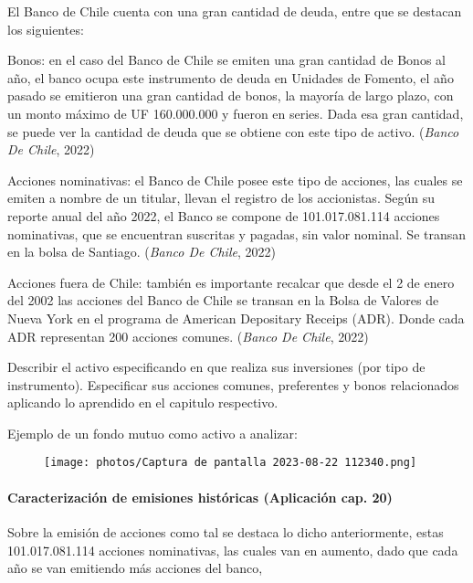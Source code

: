 \documentclass[
  letterpaper,
  DIV=11,
  numbers=noendperiod]{scrartcl}
\let\oldparagraph\paragraph
\renewcommand{\paragraph}[1]{\oldparagraph{#1}\mbox{}}
\begin{document}
El Banco de Chile cuenta con una gran cantidad de deuda, entre que se
destacan los siguientes:

Bonos: en el caso del Banco de Chile se emiten una gran cantidad de
Bonos al año, el banco ocupa este instrumento de deuda en Unidades de
Fomento, el año pasado se emitieron una gran cantidad de bonos, la
mayoría de largo plazo, con un monto máximo de UF 160.000.000 y fueron
en series. Dada esa gran cantidad, se puede ver la cantidad de deuda que
se obtiene con este tipo de activo. (\emph{Banco De Chile}, 2022)

Acciones nominativas: el Banco de Chile posee este tipo de acciones, las
cuales se emiten a nombre de un titular, llevan el registro de los
accionistas. Según su reporte anual del año 2022, el Banco se compone de
101.017.081.114 acciones nominativas, que se encuentran suscritas y
pagadas, sin valor nominal. Se transan en la bolsa de Santiago.
(\emph{Banco De Chile}, 2022)

Acciones fuera de Chile: también es importante recalcar que desde el 2
de enero del 2002 las acciones del Banco de Chile se transan en la Bolsa
de Valores de Nueva York en el programa de American Depositary Receips
(ADR). Donde cada ADR representan 200 acciones comunes. (\emph{Banco De
Chile}, 2022)

Describir el activo especificando en que realiza sus inversiones (por
tipo de instrumento). Especificar sus acciones comunes, preferentes y
bonos relacionados aplicando lo aprendido en el capitulo respectivo.

Ejemplo de un fondo mutuo como activo a analizar:

\begin{figure}

{\centering \texttt{[image: photos/Captura de pantalla 2023-08-22 112340.png]}

}

\end{figure}

\hypertarget{caracterizaciuxf3n-de-emisiones-histuxf3ricas-aplicaciuxf3n-cap.-20}{%
\paragraph{Caracterización de emisiones históricas (Aplicación cap.
20)}\label{caracterizaciuxf3n-de-emisiones-histuxf3ricas-aplicaciuxf3n-cap.-20}}

Sobre la emisión de acciones como tal se destaca lo dicho anteriormente,
estas 101.017.081.114 acciones nominativas, las cuales van en aumento,
dado que cada año se van emitiendo más acciones del banco,
\end{document}
